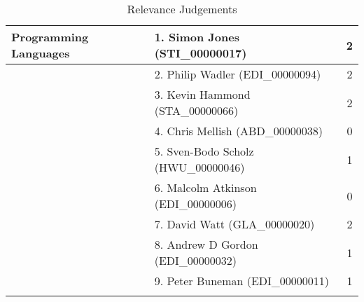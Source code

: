 \begin{longtable}{|l|l|c|}
\hline Programming Languages & 1. Simon Jones (STI\_00000017) & 2 \\
\hline  & 2. Philip Wadler (EDI\_00000094) & 2 \\
\hline  & 3. Kevin Hammond (STA\_00000066) & 2 \\
\hline  & 4. Chris Mellish (ABD\_00000038) & 0 \\
\hline  & 5. Sven-Bodo Scholz (HWU\_00000046) & 1 \\
\hline  & 6. Malcolm Atkinson (EDI\_00000006) & 0 \\
\hline  & 7. David Watt (GLA\_00000020) & 2 \\
\hline  & 8. Andrew D Gordon (EDI\_00000032) & 1 \\
\hline  & 9. Peter Buneman (EDI\_00000011) & 1 \\
\hline

\caption{Relevance Judgements} \label{table:relevanceJudgements}
\end{longtable}
\normalsize


